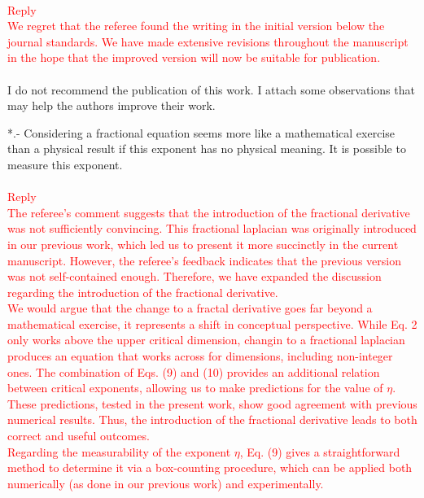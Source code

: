\documentclass[prd,aps,nofootinbib]{revtex4}
\begin{document}
\\
\textcolor{red}{Reply}\\
\textcolor{red}{ We regret that the referee found the writing in the initial version below the journal standards. We have made extensive revisions throughout the manuscript in the hope that the improved version will now be suitable for publication.}\\
\\
I do not recommend the publication of this work. I attach some observations that may help the authors improve their work.

*.- Considering a fractional equation seems more like a mathematical exercise than a physical result if this exponent has no physical meaning. It is possible to measure this exponent.\\
\\
\textcolor{red}{Reply}\\
\textcolor{red}{The referee's comment suggests that the introduction of the fractional derivative was not sufficiently convincing. This fractional laplacian was originally introduced in our previous work, which led us to present it more succinctly in the current manuscript. However, the referee's feedback indicates that the previous version was not self-contained enough. Therefore, we have expanded the discussion regarding the introduction of the fractional derivative. \\
We would argue that the change to a fractal derivative goes far beyond a mathematical exercise, it represents a shift in conceptual perspective. While Eq. 2 only works above the upper critical dimension, changin to a fractional laplacian produces an equation that works across for dimensions, including non-integer ones. The combination of Eqs. (9) and (10) provides an additional relation between critical exponents, allowing us to make predictions for the value of $\eta$. These predictions, tested in the present work, show good agreement with previous numerical results. Thus, the introduction of the fractional derivative leads to both correct and useful outcomes.\\
Regarding the measurability of the exponent $\eta$, Eq. (9) gives a straightforward method to determine it via a box-counting procedure, which can be applied both numerically (as done in our previous work) and experimentally.}%
\\
\end{document}
